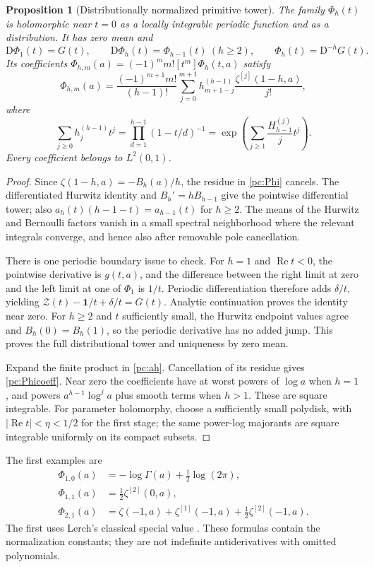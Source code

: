\documentclass[11pt,a4paper]{article}
\numberwithin{equation}{section}
\newtheorem{proposition}[theorem]{Proposition}
\theoremstyle{definition}
\newcommand{\D}{\mathrm D}
\newcommand{\Rea}{\operatorname{Re}}
\newcommand{\CZ}{\mathscr Z}
\newcommand{\one}{\mathbf 1}
\begin{document}
\begin{proposition}[Distributionally normalized primitive tower]\label{pc:primitive-tower}
The family $\Phi_h(t)$ is holomorphic near $t=0$ as a locally integrable periodic function and as a distribution. It has zero mean and
\begin{equation}\label{pc:PhiD}
\D\Phi_1(t)=G(t),\qquad \D\Phi_h(t)=\Phi_{h-1}(t)\ (h\ge2),\qquad
\Phi_h(t)=\D^{-h}G(t).
\end{equation}
Its coefficients $\Phi_{h,m}(a)=(-1)^m m![t^m]\Phi_h(t,a)$ satisfy
\begin{equation}\label{pc:Phicoeff}
\Phi_{h,m}(a)=\frac{(-1)^{m+1}m!}{(h-1)!}
\sum_{j=0}^{m+1}h_{m+1-j}^{(h-1)}
\frac{\zeta^{[j]}(1-h,a)}{j!},
\end{equation}
where
\begin{equation}\label{pc:hcomplete}
\sum_{j\ge0}h_j^{(h-1)}t^j
=\prod_{d=1}^{h-1}(1-t/d)^{-1}
=\exp\left(\sum_{j\ge1}\frac{H_{h-1}^{(j)}}j t^j\right).
\end{equation}
Every coefficient belongs to $L^2(0,1)$.
\end{proposition}
\begin{proof}
Since $\zeta(1-h,a)=-B_h(a)/h$, the residue in \eqref{pc:Phi} cancels. The differentiated Hurwitz identity and $B_h'=hB_{h-1}$ give the pointwise differential tower; also $a_h(t)(h-1-t)=a_{h-1}(t)$ for $h\ge2$. The means of the Hurwitz and Bernoulli factors vanish in a small spectral neighborhood where the relevant integrals converge, and hence also after removable pole cancellation.

There is one periodic boundary issue to check. For $h=1$ and $\Rea t<0$, the pointwise derivative is $g(t,a)$, and the difference between the right limit at zero and the left limit at one of $\Phi_1$ is $1/t$. Periodic differentiation therefore adds $\delta/t$, yielding $\CZ(t)-\one/t+\delta/t=G(t)$. Analytic continuation proves the identity near zero. For $h\ge2$ and $t$ sufficiently small, the Hurwitz endpoint values agree and $B_h(0)=B_h(1)$, so the periodic derivative has no added jump. This proves the full distributional tower and uniqueness by zero mean.

Expand the finite product in \eqref{pc:ah}. Cancellation of its residue gives \eqref{pc:Phicoeff}. Near zero the coefficients have at worst powers of $\log a$ when $h=1$, and powers $a^{h-1}\log^j a$ plus smooth terms when $h>1$. These are square integrable. For parameter holomorphy, choose a sufficiently small polydisk, with $|\Rea t|<\eta<1/2$ for the first stage; the same power-log majorants are square integrable uniformly on its compact subsets.
\end{proof}
The first examples are
\begin{align}
\Phi_{1,0}(a)&=-\log\Gamma(a)+\tfrac12\log(2\pi),\label{pc:Phi10}\\
\Phi_{1,1}(a)&=\tfrac12\zeta^{[2]}(0,a),\label{pc:Phi11}\\
\Phi_{2,1}(a)&=\zeta(-1,a)+\zeta^{[1]}(-1,a)+\tfrac12\zeta^{[2]}(-1,a).\label{pc:Phi21}
\end{align}
The first uses Lerch's classical special value \cite{pc:hurwitz}. These formulas contain the normalization constants; they are not indefinite antiderivatives with omitted polynomials.
\end{document}
